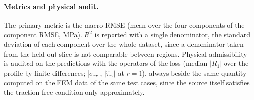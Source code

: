 
\paragraph{Metrics and physical audit.}
The primary metric is the macro-RMSE (mean over the four components of the
component RMSE, MPa). $R^2$ is reported with a single denominator, the standard
deviation of each component over the whole dataset, since a denominator taken
from the held-out slice is not comparable between regions.
Physical admissibility is audited on the predictions with the operators of the
loss (median $|R_1|$ over the profile by finite differences; $|\hat\sigma_{rr}|$,
$|\hat\tau_{rz}|$ at $r=1$), always beside the same quantity computed on the FEM
data of the same test cases, since the source itself satisfies the traction-free
condition only approximately.

